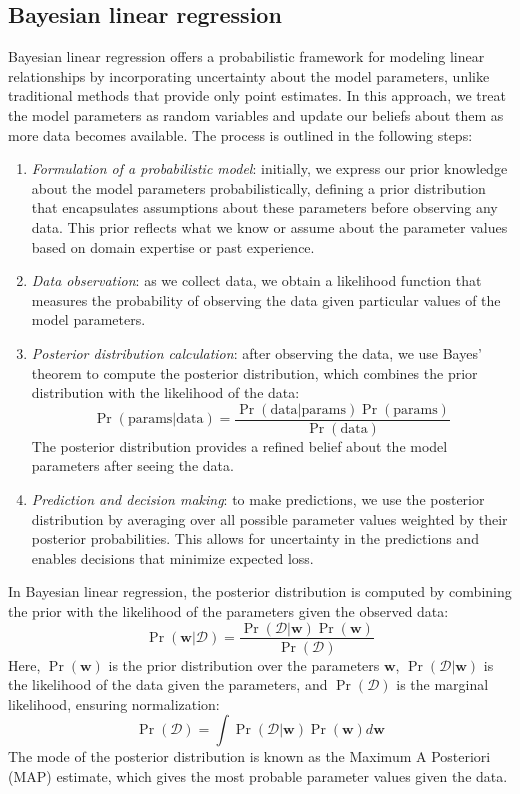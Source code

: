 \subsection{Bayesian linear regression}
Bayesian linear regression offers a probabilistic framework for modeling linear relationships by incorporating uncertainty about the model parameters, unlike traditional methods that provide only point estimates. 
In this approach, we treat the model parameters as random variables and update our beliefs about them as more data becomes available.
The process is outlined in the following steps:
\begin{enumerate}
    \item \textit{Formulation of a probabilistic model}: initially, we express our prior knowledge about the model parameters probabilistically, defining a prior distribution that encapsulates assumptions about these parameters before observing any data. 
        This prior reflects what we know or assume about the parameter values based on domain expertise or past experience.
    \item \textit{Data observation}: as we collect data, we obtain a likelihood function that measures the probability of observing the data given particular values of the model parameters.
    \item \textit{Posterior distribution calculation}: after observing the data, we use Bayes' theorem to compute the posterior distribution, which combines the prior distribution with the likelihood of the data:
        \[\Pr(\text{params}|\text{data})=\dfrac{\Pr(\text{data}|\text{params})\Pr(\text{params})}{\Pr(\text{data})}\]
        The posterior distribution provides a refined belief about the model parameters after seeing the data.
    \item \textit{Prediction and decision making}: to make predictions, we use the posterior distribution by averaging over all possible parameter values weighted by their posterior probabilities. 
        This allows for uncertainty in the predictions and enables decisions that minimize expected loss.
\end{enumerate}
In Bayesian linear regression, the posterior distribution is computed by combining the prior with the likelihood of the parameters given the observed data:
\[\Pr(\mathbf{w}|\mathcal{D})=\dfrac{\Pr(\mathcal{D}|\mathbf{w})\Pr(\mathbf{w})}{\Pr(\mathcal{D})}\]
Here, $\Pr(\mathbf{w})$ is the prior distribution over the parameters $\mathbf{w}$, $\Pr(\mathcal{D}|\mathbf{w})$ is the likelihood of the data given the parameters, and $\Pr(\mathcal{D})$ is the marginal likelihood, ensuring normalization:
\[\Pr(\mathcal{D})=\int\Pr(\mathcal{D}|\mathbf{w})\Pr(\mathbf{w})d\mathbf{w}\] 
The mode of the posterior distribution is known as the Maximum A Posteriori (MAP) estimate, which gives the most probable parameter values given the data.

